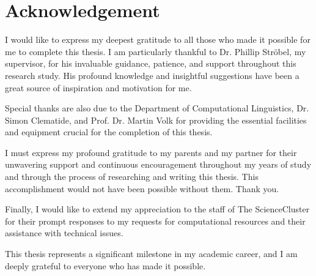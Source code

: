 {}
\chapter*{Acknowledgement}

I would like to express my deepest gratitude to all those who made it possible for me to complete this thesis. I am particularly thankful to Dr. Phillip Ströbel, my supervisor, for his invaluable guidance, patience, and support throughout this research study. His profound knowledge and insightful suggestions have been a great source of inspiration and motivation for me.

Special thanks are also due to the Department of Computational Linguistics, Dr. Simon Clematide, and Prof. Dr. Martin Volk for providing the essential facilities and equipment crucial for the completion of this thesis.

I must express my profound gratitude to my parents and my partner for their unwavering support and continuous encouragement throughout my years of study and through the process of researching and writing this thesis. This accomplishment would not have been possible without them. Thank you.

Finally, I would like to extend my appreciation to the staff of The ScienceCluster for their prompt responses to my requests for computational resources and their assistance with technical issues.

This thesis represents a significant milestone in my academic career, and I am deeply grateful to everyone who has made it possible.



\newpage